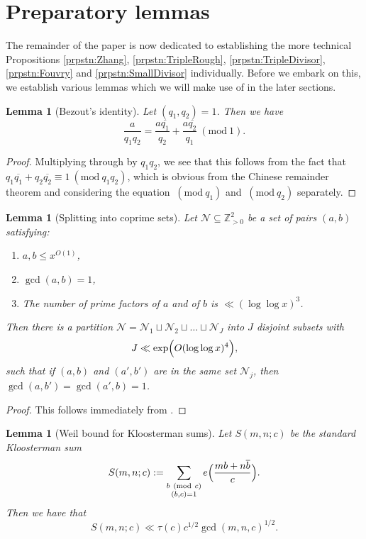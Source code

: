 \documentclass[10pt]{amsart}
\theoremstyle{plain}
\newtheorem{lmm}[thrm]{Lemma}
\numberwithin{equation}{section}
\newcommand{\Mod}[1]{\ (\mathrm{mod}\ #1)}
\begin{document}
\section{Preparatory lemmas}\label{sec:Lemmas}
%
%
%
%
The remainder of the paper is now dedicated to establishing the more technical Propositions \ref{prpstn:Zhang}, \ref{prpstn:TripleRough}, \ref{prpstn:TripleDivisor}, \ref{prpstn:Fouvry} and \ref{prpstn:SmallDivisor} individually. Before we embark on this, we establish various lemmas which we will make use of in the later sections.
%
%
%
%
%
%
%
%
\begin{lmm}[Bezout's identity]\label{lmm:Bezout}
Let $(q_1,q_2)=1$. Then we have
\[
\frac{a}{q_1 q_2}=\frac{a\overline{q_1}}{q_2}+\frac{a\overline{q_2}}{q_1}\Mod{1}.
\]
\end{lmm}
%
%
%
%
\begin{proof}
Multiplying through by $q_1q_2$, we see that this follows from the fact that $q_1\overline{q_1}+q_2\overline{q_2}\equiv 1\Mod{q_1q_2}$, which is obvious from the Chinese remainder theorem and considering the equation $\Mod{q_1}$ and $\Mod{q_2}$ separately.
\end{proof}
%
%
%
%
%
%
%
%
\begin{lmm}[Splitting into coprime sets]\label{lmm:FouvryDecomposition}
Let $\mathcal{N}\subseteq \mathbb{Z}_{>0}^2$ be a set of pairs $(a,b)$ satisfying:
\begin{enumerate}
\item $a,b\le x^{O(1)}$,
\item $\gcd(a,b)=1$,
\item The number of prime factors of $a$ and of $b$ is $\ll (\log\log{x})^3$. 
\end{enumerate}
Then there is a partition $\mathcal{N}=\mathcal{N}_1\sqcup\mathcal{N}_2\sqcup\dots \sqcup\mathcal{N}_J$ into $J$ disjoint subsets with
\[
J\ll \exp\Bigl(O(\log\log{x})^4\Bigr),
\]
such that if $(a,b)$ and $(a',b')$ are in the same set $\mathcal{N}_j$, then $\gcd(a,b')=\gcd(a',b)=1$. 
\end{lmm}
%
%
%
%
\begin{proof}
This follows immediately from \cite[Lemme 6]{Fouvry}.
\end{proof}
%
%
%
%
%
%
%
%
\begin{lmm}[Weil bound for Kloosterman sums]\label{lmm:Kloosterman}
Let $S(m,n;c)$ be the standard Kloosterman sum 
\[
S(m,n;c):=\sum_{\substack{b\Mod{c}\\ (b,c)=1}}e\Bigl(\frac{m b+ n \overline{b}}{c}\Bigr).
\]
Then we have that
\[
S(m,n;c)\ll \tau(c)c^{1/2}\gcd(m,n,c)^{1/2}.
\]
\end{lmm}
\end{document}
